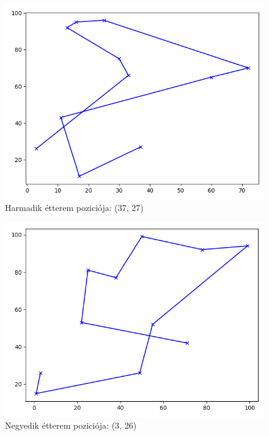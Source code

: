 \begin{figure}[h!]
\centering
\includegraphics[scale=0.8]{images/tsp3MR.png}
\caption{Harmadik étterem poziciója: (37, 27)}
\label{fig:tspMR3}
\end{figure}

\begin{figure}[h!]
\centering
\includegraphics[scale=0.8]{images/tsp4MR.png}
\caption{Negyedik étterem poziciója: (3, 26)}
\label{fig:tspMR4}
\end{figure}